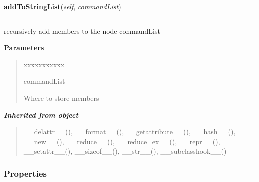     \label{tracetool:TMemberNode:addToStringList}

    \vspace{0.5ex}

\hspace{.8\funcindent}\begin{boxedminipage}{\funcwidth}

    \raggedright \textbf{addToStringList}(\textit{self}, \textit{commandList})

    \vspace{-1.5ex}

    \rule{\textwidth}{0.5\fboxrule}
\setlength{\parskip}{2ex}
    recursively add members to the node commandList

\setlength{\parskip}{1ex}
      \textbf{Parameters}
      \vspace{-1ex}

      \begin{quote}
        \begin{Ventry}{xxxxxxxxxxx}

          \item[commandList]

          Where to store members

        \end{Ventry}

      \end{quote}

    \end{boxedminipage}


\large{\textbf{\textit{Inherited from object}}}

\begin{quote}
\_\_delattr\_\_(), \_\_format\_\_(), \_\_getattribute\_\_(), \_\_hash\_\_(), \_\_new\_\_(), \_\_reduce\_\_(), \_\_reduce\_ex\_\_(), \_\_repr\_\_(), \_\_setattr\_\_(), \_\_sizeof\_\_(), \_\_str\_\_(), \_\_subclasshook\_\_()
\end{quote}


  \subsubsection{Properties}

